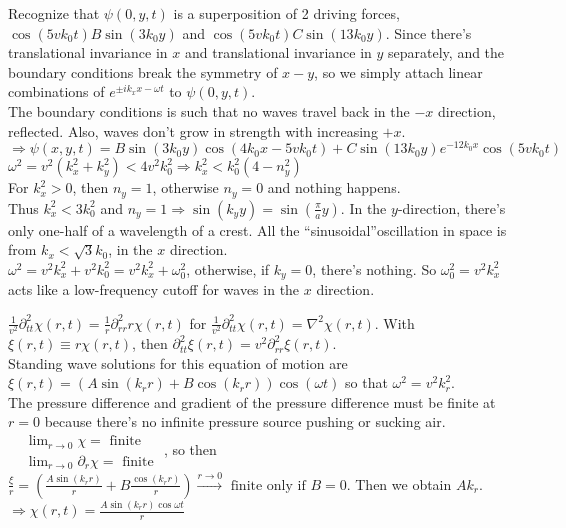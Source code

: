 \documentclass[twoside,10pt]{amsart}
\newcommand{\problemhead}[1]
  {\smallskip
   \noindent{\large\bf Problem #1.}
   \smallskip}
\begin{document}
Recognize that $\psi(0,y,t)$ is a superposition of 2 driving forces, $\cos{ (5vk_0 t)} B\sin{ (3k_0 y) }$ and $\cos{ (5 vk_0 t)} C\sin{ (13k_0 y) }$.  Since there's translational invariance in $x$ and translational invariance in $y$ separately, and the boundary conditions break the symmetry of $x-y$, so we simply attach linear combinations of $e^{ \pm i k_x x - \omega t}$ to $\psi(0,y,t)$.   \smallskip \\

The boundary conditions is such that no waves travel back in the $-x$ direction, reflected.  Also, waves don't grow in strength with increasing $+x$.  \medskip \\
$\Longrightarrow \psi(x,y,t) = B\sin{(3k_0 y)} \cos{ (4k_0 x - 5vk_0 t)} + C\sin{ (13k_0 y) }e^{-12k_0 x} \cos{ (5vk_0 t) }$ \smallskip \\

$\omega^2 = v^2 (k_x^2 + k_y^2) < 4v^2 k_0^2 \Longrightarrow k_x^2 < k_0^2 (4 - n_y^2 )$  \\
For $k_x^2 > 0$, then $n_y=1$, otherwise $n_y=0$ and nothing happens.  \smallskip \\
Thus $k_x^2 < 3k_0^2$ and $n_y=1 \Longrightarrow \sin{(k_y y)} = \sin{ \left( \frac{\pi}{a} y \right) }$.  In the $y$-direction, there's only one-half of a wavelength of a crest.  All the ``sinusoidal''oscillation in space is from $k_x < \sqrt{3} k_0$, in the $x$ direction.  \smallskip \\

$\boxed{ \omega^2= v^2 k_x^2 +v^2 k_0^2 = v^2 k_x^2 + \omega_0^2 }$, otherwise, if $k_y=0$, there's nothing.  So $\omega_0^2 = v^2 k_x^2$ acts like a low-frequency cutoff for waves in the $x$ direction.  

\problemhead{11.8} $\frac{1}{v^2} \partial_{tt}^2 \chi(r,t) = \frac{1}{r} \partial_{rr}^2 r \chi(r,t)$ for $\frac{1}{v^2} \partial_{tt}^2 \chi(r,t) = \nabla^2 \chi(r,t)$.  With $\xi(r,t) \equiv r \chi(r,t)$, then $\partial_{tt}^2 \xi(r,t) = v^2 \partial_{rr}^2 \xi(r,t)$.   \\

Standing wave solutions for this equation of motion are $\xi(r,t) = (A\sin{ (k_r r) } + B\cos{ (k_r r) } ) \cos{(\omega t) }$ so that $\omega^2 = v^2 k_r^2$.   \\

The pressure difference and gradient of the pressure difference must be finite at $r=0$ because there's no infinite pressure source pushing or sucking air.  
$\begin{aligned}
  & \lim_{r\to 0} \chi= \text{ finite } \\
  & \lim_{r \to 0} \partial_r \chi = \text{ finite } 
\end{aligned}$, so then $\frac{ \xi}{r} = \left( \frac{ A \sin{(k_r r) } }{r} + B \frac{ \cos{(k_r r) }}{r} \right) \xrightarrow{r\to 0} \text{ finite only if $B=0$}$.  Then we obtain $Ak_r$.  \\
$\Longrightarrow \chi(r,t) = \frac{ A \sin{ (k_r r) } \cos{ \omega t} }{ r }$ \medskip \\
\end{document}
